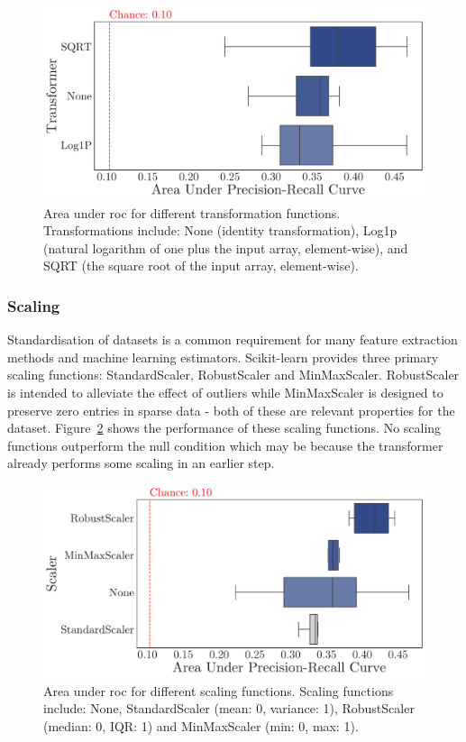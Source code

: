 \documentclass[../thesis/thesis.tex]{subfiles}
\begin{document}
\begin{figure}[!htb]
    \centering
    \includegraphics[width=\textwidth]{../figures/design/auc_transformer}
    \caption[Area under \gls{pr} Curves by transformation function]{Area under \gls{roc} for different transformation functions. Transformations include: None (identity transformation), Log1p (natural logarithm of one plus the input array, element-wise), and SQRT (the square root of the input array, element-wise).}
    \label{fig:design:transformer}
\end{figure}

\subsubsection{Scaling}

Standardisation of datasets is a common requirement for many feature extraction methods and machine learning estimators. Scikit-learn provides three primary scaling functions: StandardScaler, RobustScaler and MinMaxScaler. RobustScaler is intended to alleviate the effect of outliers while MinMaxScaler is designed to preserve zero entries in sparse data - both of these are relevant properties for the dataset. Figure~\ref{fig:design:scaler} shows the performance of these scaling functions. No scaling functions outperform the null condition which may be because the transformer already performs some scaling in an earlier step.

\begin{figure}[!htb]
    \centering
    \includegraphics[width=\textwidth]{../figures/design/auc_scaler}
    \caption[Area under \gls{pr} Curves by scaling function]{Area under \gls{roc} for different scaling functions. Scaling functions include: None, StandardScaler (mean: 0, variance: 1), RobustScaler (median: 0, IQR: 1) and MinMaxScaler (min: 0, max: 1).}
    \label{fig:design:scaler}
\end{figure}
\end{document}
